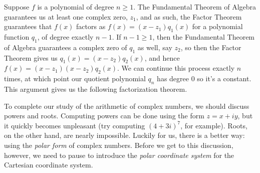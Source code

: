 \enlargethispage{2\baselineskip}

\smallskip

Suppose  $f$ is a polynomial of degree $n \geq 1$.  The Fundamental Theorem of Algebra guarantees us at least one complex zero, $z_{1}$, and as such, the Factor Theorem guarantees that $f(x)$ factors as $f(x) = \left(x - z_{1}\right) q_{1}(x)$ for a polynomial function $q_{1}$,  of degree exactly $n-1$.  If $n-1 \geq 1$, then the Fundamental Theorem of Algebra guarantees a complex zero of $q_{1}$ as well, say $z_{2}$, so then the Factor Theorem gives us $q_{1}(x) = \left(x - z_{2}\right) q_{2}(x)$, and hence $f(x) = \left(x - z_{1}\right) \left(x - z_{2}\right) q_{2}(x)$.  We can continue this process exactly $n$ times, at which point our quotient polynomial $q_{n}$ has degree $0$ so it's a constant.  This argument gives us the following factorization theorem.

\smallskip


\smallskip

To complete our study of the arithmetic of complex numbers, we should discuss powers and roots. Computing powers can be done using the form $z=x+iy$, but it quickly becomes unpleasant (try computing $(4+3i)^7$, for example). Roots, on the other hand, are nearly impossible. Luckily for us, there is a better way: using the \textit{polar form} of complex numbers. Before we get to this discussion, however, we need to pause to introduce the \textit{polar coordinate system} for the Cartesian coordinate system.

